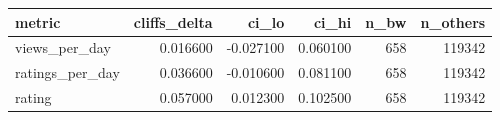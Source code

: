\begin{tabular}{lrrrrr}
\toprule
metric & cliffs_delta & ci_lo & ci_hi & n_bw & n_others \\
\midrule
views_per_day & 0.016600 & -0.027100 & 0.060100 & 658 & 119342 \\
ratings_per_day & 0.036600 & -0.010600 & 0.081100 & 658 & 119342 \\
rating & 0.057000 & 0.012300 & 0.102500 & 658 & 119342 \\
\bottomrule
\end{tabular}
